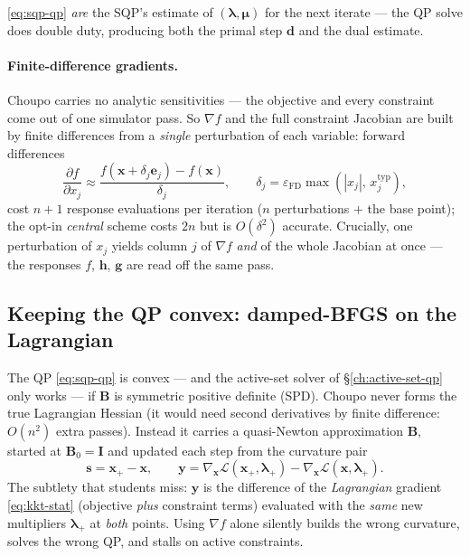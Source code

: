 \documentclass[11pt,a4paper]{article}
\newcommand{\xv}{\mathbf{x}}
\newcommand{\dv}{\mathbf{d}}                          %
\newcommand{\Bv}{\mathbf{B}}                          %
\begin{document}
\eqref{eq:sqp-qp} \emph{are} the SQP's estimate of $(\boldsymbol\lambda,
\boldsymbol\mu)$ for the next iterate --- the QP solve does double duty,
producing both the primal step $\dv$ and the dual estimate.

\paragraph{Finite-difference gradients.}
Choupo carries no analytic sensitivities --- the objective and every
constraint come out of one simulator pass. So $\nabla f$ and the full
constraint Jacobian are built by finite differences from a \emph{single}
perturbation of each variable: forward differences
\begin{equation}
   \frac{\partial f}{\partial x_j}
     \approx \frac{f(\xv + \delta_j \mathbf e_j) - f(\xv)}{\delta_j},
   \qquad
   \delta_j = \varepsilon_{\mathrm{FD}}\max(|x_j|,\, x_j^{\mathrm{typ}}),
\end{equation}
cost $n+1$ response evaluations per iteration ($n$ perturbations $+$ the
base point); the opt-in \emph{central} scheme costs $2n$ but is
$O(\delta^2)$ accurate. Crucially, one perturbation of $x_j$ yields
column $j$ of $\nabla f$ \emph{and} of the whole Jacobian at once --- the
responses $f$, $\mathbf h$, $\mathbf g$ are read off the same pass.

\subsection{Keeping the QP convex: damped-BFGS on the Lagrangian}
\label{sec:sqp-bfgs}

The QP \eqref{eq:sqp-qp} is convex --- and the active-set solver of
§\ref{ch:active-set-qp} only works --- if $\Bv$ is symmetric positive
definite (SPD). Choupo never forms the true Lagrangian Hessian (it would
need second derivatives by finite difference: $O(n^2)$ extra passes).
Instead it carries a quasi-Newton approximation $\Bv$, started at
$\Bv_0 = \mathbf I$ and updated each step from the curvature pair
\begin{equation}
   \mathbf s = \xv_{+} - \xv,
   \qquad
   \mathbf y = \nabla_{\!\xv}\mathcal L(\xv_{+}, \boldsymbol\lambda_{+})
             - \nabla_{\!\xv}\mathcal L(\xv,   \boldsymbol\lambda_{+}).
   \label{eq:bfgs-sy}
\end{equation}
The subtlety that students miss: $\mathbf y$ is the difference of the
\emph{Lagrangian} gradient \eqref{eq:kkt-stat} (objective \emph{plus}
constraint terms) evaluated with the \emph{same} new multipliers
$\boldsymbol\lambda_{+}$ at \emph{both} points. Using $\nabla f$ alone
silently builds the wrong curvature, solves the wrong QP, and stalls on
active constraints.
\end{document}
